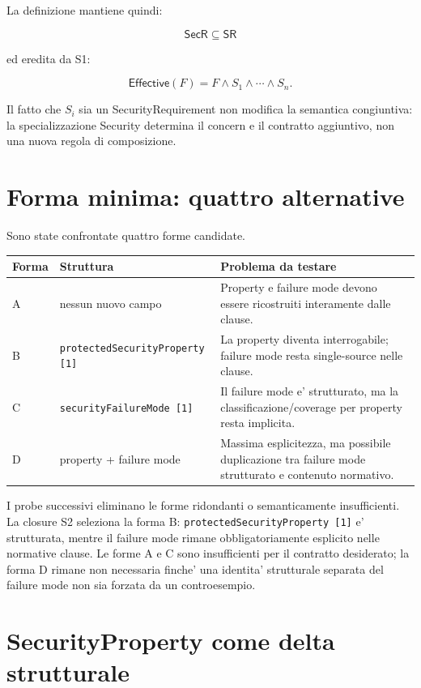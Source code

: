 \documentclass[11pt,a4paper]{article}
\newcommand{\SR}{\mathsf{SR}}
\newcommand{\SecR}{\mathsf{SecR}}
\begin{document}
La definizione mantiene quindi:

\[
  \SecR \subseteq \SR
\]

ed eredita da S1:

\[
  \mathsf{Effective}(F)=F \land S_1 \land \cdots \land S_n.
\]

Il fatto che $S_i$ sia un SecurityRequirement non modifica la semantica congiuntiva: la specializzazione Security determina il concern e il contratto aggiuntivo, non una nuova regola di composizione.

\section{Forma minima: quattro alternative}

Sono state confrontate quattro forme candidate.

\begin{longtable}{p{}p{}p{}}
\toprule
\textbf{Forma} & \textbf{Struttura} & \textbf{Problema da testare} \\
\midrule
\endhead
A & nessun nuovo campo & Property e failure mode devono essere ricostruiti interamente dalle clause. \\
\addlinespace
B & \texttt{protectedSecurityProperty [1]} & La property diventa interrogabile; failure mode resta single-source nelle clause. \\
\addlinespace
C & \texttt{securityFailureMode [1]} & Il failure mode e' strutturato, ma la classificazione/coverage per property resta implicita. \\
\addlinespace
D & property + failure mode & Massima esplicitezza, ma possibile duplicazione tra failure mode strutturato e contenuto normativo. \\
\bottomrule
\end{longtable}

I probe successivi eliminano le forme ridondanti o semanticamente insufficienti. La closure S2 seleziona la forma B: \texttt{protectedSecurityProperty [1]} e' strutturata, mentre il failure mode rimane obbligatoriamente esplicito nelle normative clause. Le forme A e C sono insufficienti per il contratto desiderato; la forma D rimane non necessaria finche' una identita' strutturale separata del failure mode non sia forzata da un controesempio.

\section{SecurityProperty come delta strutturale}
\end{document}
